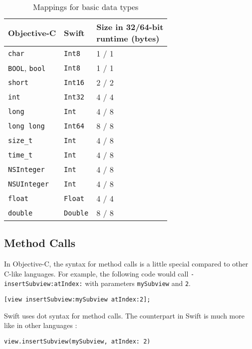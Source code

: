 \documentclass{sfuthesis}
\begin{document}
\begin{table}[H]
\begin{center}
\begin{tabular}{|l|l|l|}
\hline
{\bf Objective-C \cite{objcdatatypes}} & {\bf Swift \cite{swiftdatatypes}} & \specialcell{{\bf Size in 32/64-bit}\\{\bf runtime (bytes)}} \\
\hline
\texttt{char}       & \texttt{Int8}   & 1 / 1 \\
\texttt{BOOL}, \texttt{bool} & \texttt{Int8}   & 1 / 1 \\
\texttt{short}      & \texttt{Int16}  & 2 / 2 \\
\texttt{int}        & \texttt{Int32}  & 4 / 4 \\
\texttt{long}       & \texttt{Int}    & 4 / 8 \\
\texttt{long long}  & \texttt{Int64}  & 8 / 8 \\
\texttt{size\_t}    & \texttt{Int}    & 4 / 8 \\
\texttt{time\_t}    & \texttt{Int}    & 4 / 8 \\
\texttt{NSInteger}  & \texttt{Int}    & 4 / 8 \\
\texttt{NSUInteger} & \texttt{Int}    & 4 / 8 \\
\texttt{float}      & \texttt{Float}  & 4 / 4 \\
\texttt{double}     & \texttt{Double} & 8 / 8 \\
\hline
\end{tabular}
\end{center}
\caption{Mappings for basic data types}
\end{table}

\subsection{Method Calls}

In Objective-C, the syntax for method calls is a little special compared to other C-like languages. For example, the following code would call \texttt{- insertSubview:atIndex:} with parameters \texttt{mySubview} and \texttt{2}.

\begin{verbatim}
[view insertSubview:mySubview atIndex:2];
\end{verbatim}

Swift uses dot syntax for method calls. The counterpart in Swift is much more like in other languages \cite{swiftobjcapis}:

\begin{verbatim}
view.insertSubview(mySubview, atIndex: 2)
\end{verbatim}
\end{document}
